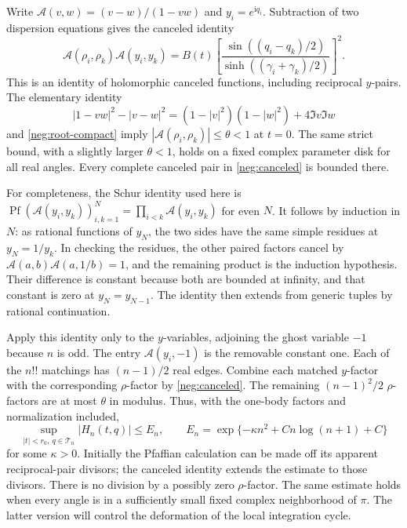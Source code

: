 \documentclass[11pt]{article}
\numberwithin{equation}{section}
\theoremstyle{definition}
\newcommand{\ii}{\mathrm i}
\begin{document}
Write \(\mathcal A(v,w)=(v-w)/(1-vw)\) and \(y_i=e^{\ii q_i}\).
Subtraction of two dispersion equations gives the canceled identity
\begin{equation}
 \mathcal A(\rho_i,\rho_k)\mathcal A(y_i,y_k)
 =B(t)\left[
    \frac{\sin((q_i-q_k)/2)}
         {\sinh((\gamma_i+\gamma_k)/2)}
       \right]^2 .
 \label{neg:canceled}
\end{equation}
This is an identity of holomorphic canceled functions, including
reciprocal \(y\)-pairs.  The elementary identity
\begin{equation}
 |1-vw|^2-|v-w|^2
 =(1-|v|^2)(1-|w|^2)+4\Im v\Im w
 \label{neg:schur}
\end{equation}
and \eqref{neg:root-compact} imply
\(|\mathcal A(\rho_i,\rho_k)|\le\theta<1\) at \(t=0\).
The same strict bound, with a slightly larger \(\theta<1\), holds
on a fixed complex parameter disk for all real angles.  Every
complete canceled pair in \eqref{neg:canceled} is bounded there.

For completeness, the Schur identity used here is
\(\operatorname{Pf}(\mathcal A(y_i,y_k))_{i,k=1}^{N}
=\prod_{i<k}\mathcal A(y_i,y_k)\) for even \(N\).
It follows by induction in \(N\): as rational functions of \(y_N\),
the two sides have the same simple residues at \(y_N=1/y_k\).
In checking the residues, the other paired factors cancel by
\(\mathcal A(a,b)\mathcal A(a,1/b)=1\), and the remaining product
is the induction hypothesis.  Their difference is constant because
both are bounded at infinity, and that constant is zero at
\(y_N=y_{N-1}\).  The identity then extends from generic tuples
by rational continuation.

Apply this identity only to the \(y\)-variables, adjoining the
ghost variable \(-1\) because \(n\) is odd.  The entry
\(\mathcal A(y_i,-1)\) is the removable constant one.
Each of the \(n!!\) matchings has \((n-1)/2\) real edges.
Combine each matched \(y\)-factor with the corresponding
\(\rho\)-factor by \eqref{neg:canceled}.  The remaining
\((n-1)^2/2\) \(\rho\)-factors are at most \(\theta\) in modulus.
Thus, with the one-body factors and normalization included,
\begin{equation}
 \sup_{|t|<r_0,\ q\in\mathcal T_n}|H_n(t,q)|
 \le E_n,\qquad
 E_n=\exp\{-\kappa n^2+C n\log(n+1)+C\}
 \label{neg:gaussian}
\end{equation}
for some \(\kappa>0\).  Initially the Pfaffian calculation can be
made off its apparent reciprocal-pair divisors; the canceled
identity extends the estimate to those divisors.  There is no
division by a possibly zero \(\rho\)-factor.  The same estimate
holds when every angle is in a sufficiently small fixed complex
neighborhood of \(\pi\).  The latter version will control the
deformation of the local integration cycle.
\end{document}

